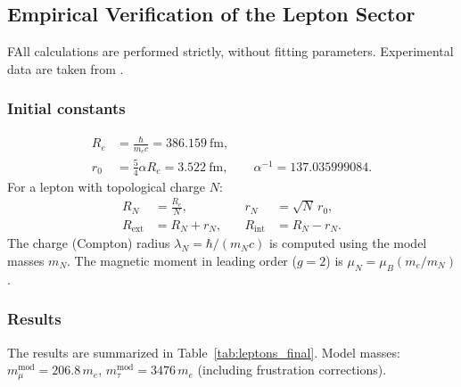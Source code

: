 \documentclass[11pt,a4paper]{article}
\begin{document}
\subsection{Empirical Verification of the Lepton Sector}
\label{sec:lepton_verification}

FAll calculations are performed strictly, without fitting parameters. Experimental data are taken from \cite{PDG:2024}.

\subsubsection{Initial constants}
\begin{align}
R_e &= \frac{\hbar}{m_e c} = 386.159\ \text{fm}, \\
r_0 &= \frac{5}{4}\alpha R_e = 3.522\ \text{fm},\qquad \alpha^{-1}=137.035999084.
\end{align}
For a lepton with topological charge $N$:
\begin{align}
R_N &= \frac{R_e}{N}, &\quad r_N &= \sqrt{N}\, r_0, \\
R_{\text{ext}} &= R_N + r_N, &\quad R_{\text{int}} &= R_N - r_N.
\end{align}
The charge (Compton) radius $\lambda_N = \hbar/(m_N c)$ is computed using the model masses $m_N$. The magnetic moment in leading order ($g=2$) is $\mu_N = \mu_B (m_e/m_N)$.

\subsubsection{Results}
The results are summarized in Table~\ref{tab:leptons_final}. Model masses: $m_\mu^{\text{mod}}=206.8\,m_e$, $m_\tau^{\text{mod}}=3476\,m_e$ (including frustration corrections).
\end{document}
